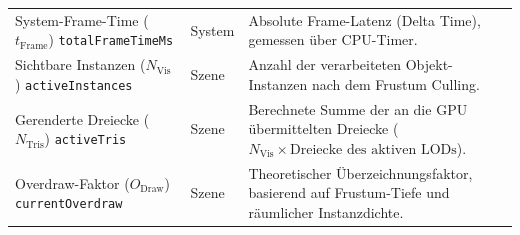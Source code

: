 \begin{longtable}{@{} >{\raggedright\arraybackslash}p{} p{}
        >{\raggedright\arraybackslash}p{} @{}}
    System-Frame-Time ($t_{\text{Frame}}$) \newline \scriptsize{\texttt{totalFrameTimeMs}} & System & Absolute
    Frame-Latenz (Delta Time), gemessen über \ac{CPU}-Timer. \\

    Sichtbare Instanzen ($N_{\text{Vis}}$) \newline \scriptsize{\texttt{activeInstances}} & Szene & Anzahl der
    verarbeiteten Objekt-Instanzen nach dem Frustum Culling. \\

    Gerenderte Dreiecke ($N_{\text{Tris}}$) \newline \scriptsize{\texttt{activeTris}} & Szene & Berechnete Summe der an
    die \ac{GPU} übermittelten Dreiecke ($N_{\text{Vis}} \times \text{Dreiecke des aktiven LODs}$). \\

    Overdraw-Faktor ($O_{\text{Draw}}$) \newline \scriptsize{\texttt{currentOverdraw}} & Szene & Theoretischer
    Überzeichnungsfaktor, basierend auf Frustum-Tiefe und räumlicher Instanzdichte. \\
\end{longtable}

